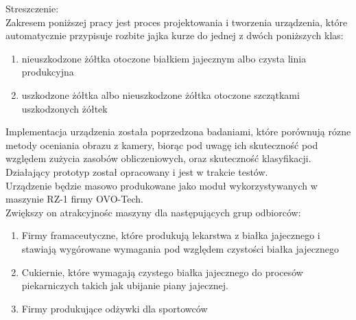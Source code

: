 \documentclass[12pt,twoside,a4paper]{article}
\begin{document}
Streszczenie:\\
Zakresem poniższej pracy jest proces projektowania i tworzenia urządzenia, które automatycznie przypisuje rozbite jajka kurze do jednej z dwóch poniższych klas:\\
\begin{enumerate}
\item nieuszkodzone żółtka otoczone białkiem jajecznym albo czysta linia produkcyjna
\item uszkodzone żółtka albo nieuszkodzone żółtka otoczone szczątkami uszkodzonych żółtek
\end{enumerate}
Implementacja urządzenia została poprzedzona badaniami, które porównują rózne metody oceniania obrazu z kamery, biorąc pod uwagę ich skuteczność pod względem zużycia zasobów obliczeniowych, oraz skuteczność klasyfikacji.\\
Działający prototyp został opracowany i jest w trakcie testów.\\
Urządzenie będzie masowo produkowane jako moduł wykorzystywanych w maszynie RZ-1 firmy OVO-Tech.\\
Zwiększy on atrakcyjnośc maszyny dla następujących grup odbiorców:\\

\begin{enumerate}
\item Firmy framaceutyczne, które produkują lekarstwa z białka jajecznego i stawiają wygórowane wymagania pod względem czystości białka jajecznego
\item Cukiernie, które wymagają czystego białka jajecznego do procesów piekarniczych takich jak ubijanie piany jajecznej.
\item Firmy produkujące odżywki dla sportowców
\end{enumerate}
\end{document}
